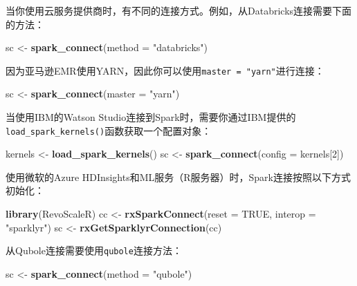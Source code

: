 \documentclass[
]{article}
\newenvironment{Shaded}{\begin{snugshade}}{\end{snugshade}}
\newcommand{\DataTypeTok}[1]{\textcolor[rgb]{0.13,0.29,0.53}{#1}}
\newcommand{\DecValTok}[1]{\textcolor[rgb]{0.00,0.00,0.81}{#1}}
\newcommand{\KeywordTok}[1]{\textcolor[rgb]{0.13,0.29,0.53}{\textbf{#1}}}
\newcommand{\NormalTok}[1]{#1}
\newcommand{\OtherTok}[1]{\textcolor[rgb]{0.56,0.35,0.01}{#1}}
\newcommand{\StringTok}[1]{\textcolor[rgb]{0.31,0.60,0.02}{#1}}
\begin{document}
当你使用云服务提供商时，有不同的连接方式。例如，从Databricks连接需要下面的方法：

\begin{Shaded}
\begin{Highlighting}[]
\NormalTok{sc <-}\StringTok{ }\KeywordTok{spark_connect}\NormalTok{(}\DataTypeTok{method =} \StringTok{"databricks"}\NormalTok{)}
\end{Highlighting}
\end{Shaded}

因为亚马逊EMR使用YARN，因此你可以使用\texttt{master\ =\ "yarn"}进行连接：

\begin{Shaded}
\begin{Highlighting}[]
\NormalTok{sc <-}\StringTok{ }\KeywordTok{spark_connect}\NormalTok{(}\DataTypeTok{master =} \StringTok{"yarn"}\NormalTok{)}
\end{Highlighting}
\end{Shaded}

当使用IBM的Watson
Studio连接到Spark时，需要你通过IBM提供的\texttt{load\_spark\_kernels()}函数获取一个配置对象：

\begin{Shaded}
\begin{Highlighting}[]
\NormalTok{kernels <-}\StringTok{ }\KeywordTok{load_spark_kernels}\NormalTok{()}
\NormalTok{sc <-}\StringTok{ }\KeywordTok{spark_connect}\NormalTok{(}\DataTypeTok{config =}\NormalTok{ kernels[}\DecValTok{2}\NormalTok{])}
\end{Highlighting}
\end{Shaded}

使用微软的Azure
HDInsights和ML服务（R服务器）时，Spark连接按照以下方式初始化：

\begin{Shaded}
\begin{Highlighting}[]
\KeywordTok{library}\NormalTok{(RevoScaleR)}
\NormalTok{cc <-}\StringTok{ }\KeywordTok{rxSparkConnect}\NormalTok{(}\DataTypeTok{reset =} \OtherTok{TRUE}\NormalTok{, }\DataTypeTok{interop =} \StringTok{"sparklyr"}\NormalTok{)}
\NormalTok{sc <-}\StringTok{ }\KeywordTok{rxGetSparklyrConnection}\NormalTok{(cc)}
\end{Highlighting}
\end{Shaded}

从Qubole连接需要使用\texttt{qubole}连接方法：

\begin{Shaded}
\begin{Highlighting}[]
\NormalTok{sc <-}\StringTok{ }\KeywordTok{spark_connect}\NormalTok{(}\DataTypeTok{method =} \StringTok{"qubole"}\NormalTok{)}
\end{Highlighting}
\end{Shaded}
\end{document}
